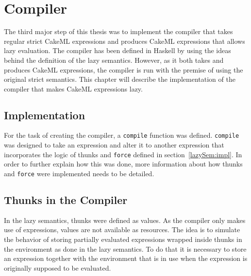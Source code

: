 \chapter{Compiler}
\label{chapter:compiler}
The third major step of this thesis was to implement the compiler that takes
regular strict CakeML expressions and produces CakeML expressions that allows
lazy evaluation. The compiler has been defined in Haskell by using the ideas
behind the definition of the lazy semantics. However, as it both takes and
produces CakeML expressions, the compiler is run with the premise of using the
original strict semantics. This chapter will describe the implementation of the
compiler that makes CakeML expressions lazy.

\section{Implementation}

For the task of creating the compiler, a \texttt{compile} function was defined.
\texttt{compile} was designed to take an expression and alter it to another
expression that incorporates the logic of thunks and \texttt{force} defined in
section~\ref{lazySem:impl}. In order to further explain how this was done,
more information about how thunks and \texttt{force} were implemented needs to
be detailed.

\section{Thunks in the Compiler}
\label{comp:thunk}
In the lazy semantics, thunks were defined as values. As the compiler only makes
use of expressions, values are not available as resources.
The idea is to simulate the behavior of storing
partially evaluated expressions wrapped inside thunks in the environment as
done in the lazy semantics. To do that it is necessary to store an expression
together with the environment that is in use when the expression is originally
supposed to be evaluated.

